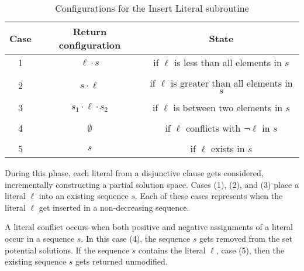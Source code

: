 \begin{table}[htdp]
\caption{Configurations for the {\sc Insert Literal} subroutine}
\begin{center}
\begin{tabular}{|c|c|c|}
\hline
\textbf{Case} & \textbf{Return configuration} & \textbf{State} \\ \hline 
1	& $\ell \cdot s$ & if $\ell$ is less than all elements in $s$ \\ 
& &  \\ \hline
2	& $s \cdot \ell$ & if $\ell$ is greater than all elements in $s$ \\ 
& &  \\ \hline
3	& $s_1 \cdot \ell \cdot s_2$ & if $\ell$ is between two elements in $s$ \\ 
& &  \\ \hline
4	& $\emptyset$ & if $\ell$ conflicts with $\neg \ell$ in $s$\\
& &  \\ \hline
5	& $s$ & if $\ell$ exists in $s$\\ \hline
\end{tabular}
\end{center}
\label{distributionInsertTable}
\end{table}%

\FloatBarrier

		
During this phase, each literal from a disjunctive clause gets considered, incrementally constructing a partial solution space.  Cases (1), (2), and (3) place a literal $\ell$ into an existing sequence $s$.  Each of these cases represents when the literal $\ell$ get inserted in a non-decreasing sequence.



A literal conflict occurs when both positive and negative assignments of a literal occur in a sequence $s$.  In this case (4), the sequence $s$ gets removed from the set potential solutions.  If the sequence $s$ contains the literal $\ell$, case (5), then the existing sequence $s$ gets returned unmodified.


